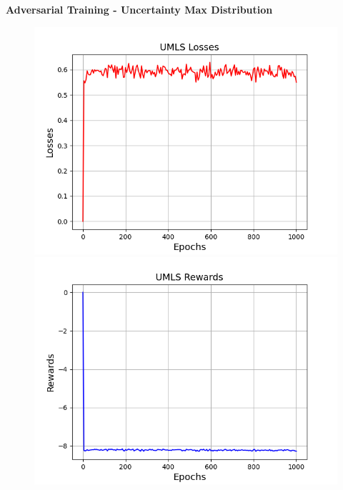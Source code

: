 \textbf{Adversarial Training - Uncertainty Max Distribution}\\
\begin{figure}
    \centering
    \begin{minipage}{.5\textwidth}
      \centering
      \includegraphics[width=0.9\linewidth]{figures/results/UMLS/AdversarialTraining/Uncertainty/Max_Distribution/gan_train_umls_losses.png}
    \end{minipage}%
    \begin{minipage}{.5\textwidth}
      \centering
      \includegraphics[width=0.9\linewidth]{figures/results/UMLS/AdversarialTraining/Uncertainty/Max_Distribution/gan_train_umls_rewards.png}
    \end{minipage}
    \begin{minipage}{.5\textwidth}
      \centering

\end{minipage}
\end{figure}

